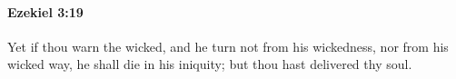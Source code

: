 
		\paragraph{Ezekiel 3:19} %
			\label{EZEKIEL-3-19}

			Yet if thou warn the wicked, and he turn not from his wickedness, nor from his wicked way, he shall die in his iniquity; but thou hast delivered thy soul.



